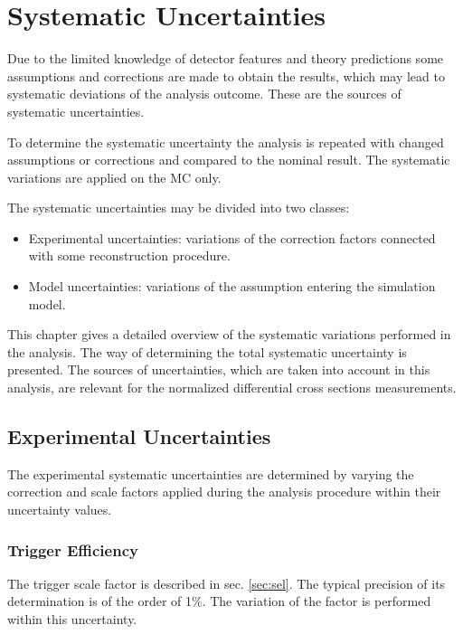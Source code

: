 \chapter{Systematic Uncertainties}\label{chapt:syst}

Due to the limited knowledge of detector features and theory predictions some assumptions and corrections are
made to obtain the results, which may lead to systematic deviations of the analysis outcome.
These are the sources of systematic uncertainties.

To determine the systematic uncertainty the analysis is repeated with changed assumptions or corrections and compared
to the nominal result. The systematic variations are applied on the MC only.

The systematic uncertainties may be divided into two classes:
\begin{itemize}
 \item Experimental uncertainties: variations of the correction factors connected with some reconstruction procedure.
 \item Model uncertainties: variations of the assumption entering the simulation model.
\end{itemize}

This chapter gives a detailed overview of the systematic variations performed in the analysis. The way
of determining the total systematic uncertainty is presented. The sources of uncertainties, which are taken into
account in this analysis, are relevant for the normalized differential cross sections measurements.

\section{Experimental Uncertainties}

The experimental systematic uncertainties are determined by varying the correction and scale factors applied during the
analysis procedure within their uncertainty values.

\subsection{Trigger Efficiency}

The trigger scale factor is described in sec. \ref{sec:sel}. The typical precision of its determination is of the order
of 1\%. The variation of the factor is performed within this uncertainty.

